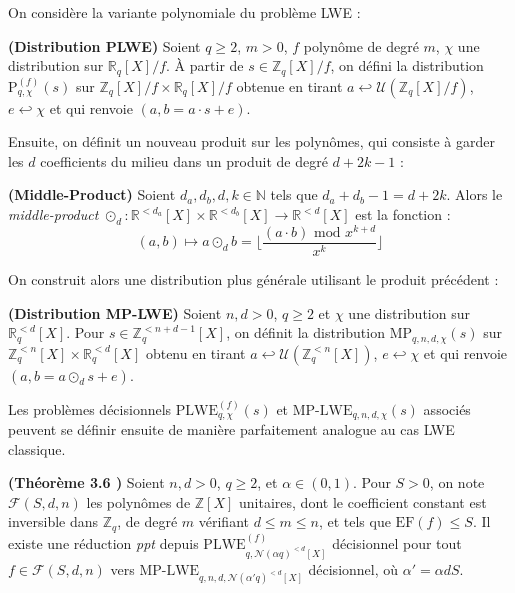 \documentclass[11pt,a4paper]{article}
\begin{document}
On considère la variante polynomiale du problème LWE :
\begin{defin}\textbf{(Distribution PLWE)}
Soient $q \geq 2$, $m>0$, $f$ polynôme de degré $m$, $\chi$ une distribution sur $\mathbb{R}_q[X]/f$. À partir de $s\in \mathbb{Z}_q[X]/f$, on défini la distribution $\text{P}^{(f)}_{q,\chi}(s)$ sur $\mathbb{Z}_q[X]/f \times \mathbb{R}_q[X]/f$ obtenue en tirant $a \hookleftarrow \mathcal{U}(\mathbb{Z}_q[X]/f)$, $e\hookleftarrow \chi$ et qui renvoie $(a,b=a\cdot s+e)$.
\end{defin}

Ensuite, on définit un nouveau produit sur les polynômes, qui consiste à garder les $d$ coefficients du milieu dans un produit de degré $d+2k-1$ : 
\begin{defin}\textbf{(Middle-Product)}
Soient $d_a,d_b,d,k \in \mathbb{N}$ tels que $d_a+d_b-1=d+2k$. Alors le \textit{middle-product} $\odot_d : \mathbb{R}^{<d_a}[X]\times\mathbb{R}^{<d_b}[X]\to\mathbb{R}^{<d}[X]$ est la fonction :
\[(a,b) \mapsto a \odot_d b = \lfloor \frac{(a\cdot b)\text{ mod }x^{k+d}}{x^k} \rfloor\]
\end{defin}
On construit alors une distribution plus générale utilisant le produit précédent : 
\begin{defin}\textbf{(Distribution MP-LWE)}
Soient $n,d >0$, $q\geq 2$ et $\chi$ une distribution sur $\mathbb{R}_q^{<d}[X]$. Pour $s\in \mathbb{Z}_q^{<n+d-1}[X]$, on définit la distribution $\text{MP}_{q,n,d,\chi}(s)$ sur $\mathbb{Z}_q^{<n}[X]\times\mathbb{R}_q^{<d}[X]$ obtenu en tirant $a \hookleftarrow \mathcal{U}(\mathbb{Z}_q^{<n}[X])$, $e\hookleftarrow \chi$ et qui renvoie $(a,b=a\odot_d s+e)$. 
\end{defin}

Les problèmes décisionnels $\text{PLWE}^{(f)}_{q,\chi}(s)$ et $\text{MP-LWE}_{q,n,d,\chi}(s)$ associés peuvent se définir ensuite de manière parfaitement analogue au cas LWE classique. \\

\begin{theorem}\textbf{(Théorème 3.6 \cite{mplwe})}
Soient $n,d >0$, $q\geq 2$, et $\alpha \in (0,1)$. Pour $S>0$, on note $\mathcal{F}(S,d,n)$ les polynômes de $\mathbb{Z}[X]$ unitaires, dont le coefficient constant est inversible dans $\mathbb{Z}_q$, de degré $m$ vérifiant $d\leq m\leq n$, et tels que $\text{EF}(f)\leq S$. Il existe une réduction \textit{ppt} depuis $\text{PLWE}^{(f)}_{q,\mathcal{N}(\alpha q)^{<d}[X]}$ décisionnel pour tout $f\in\mathcal{F}(S,d,n)$ vers  $\text{MP-LWE}_{q,n,d,\mathcal{N}(\alpha' q)^{<d}[X]}$ décisionnel, où $\alpha' = \alpha d S$.
\end{theorem}
\end{document}
